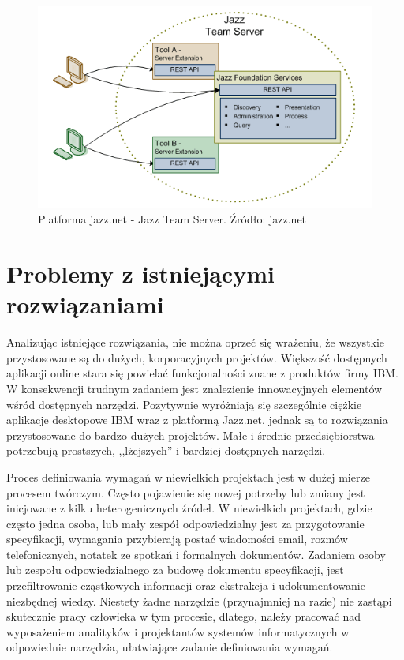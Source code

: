      \begin{figure}[t]
        \centering
        \includegraphics[width=1.0\textwidth]{img/jts.png}
        \caption{Platforma jazz.net - Jazz Team Server. Źródło: jazz.net}
        \label{fig:jts}
      \end{figure}

  \section{Problemy z istniejącymi rozwiązaniami}

      Analizując istniejące rozwiązania, nie można oprzeć się wrażeniu, że wszystkie przystosowane są do dużych, korporacyjnych projektów. Większość dostępnych aplikacji online stara się powielać funkcjonalności znane z produktów firmy IBM. W konsekwencji trudnym zadaniem jest znalezienie innowacyjnych elementów wśród dostępnych narzędzi. Pozytywnie wyróżniają się szczególnie ciężkie aplikacje desktopowe IBM wraz z platformą Jazz.net, jednak są to rozwiązania przystosowane do bardzo dużych projektów. Małe i średnie przedsiębiorstwa potrzebują prostszych, ,,lżejszych'' i bardziej dostępnych narzędzi. 

      Proces definiowania wymagań w niewielkich projektach jest w dużej mierze procesem twórczym. Często pojawienie się nowej potrzeby lub zmiany jest inicjowane z kilku heterogenicznych źródeł. W niewielkich projektach, gdzie często jedna osoba, lub mały zespół odpowiedzialny jest za przygotowanie specyfikacji, wymagania przybierają postać wiadomości email, rozmów telefonicznych, notatek ze spotkań i formalnych dokumentów. Zadaniem osoby lub zespołu odpowiedzialnego za budowę dokumentu specyfikacji, jest przefiltrowanie cząstkowych informacji oraz ekstrakcja i udokumentowanie niezbędnej wiedzy. Niestety żadne narzędzie (przynajmniej na razie) nie zastąpi skutecznie pracy człowieka w tym procesie, dlatego, należy pracować nad wyposażeniem analityków i projektantów systemów informatycznych w odpowiednie narzędzia, ułatwiające zadanie definiowania wymagań. 
